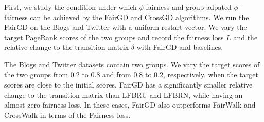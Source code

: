 
\subsubsection{\pagerank}


First, we study the condition under which $\phi$-fairness and group-adpated $\phi$-fairness can be achieved by the FairGD and CrossGD algorithms. We run the FairGD on the Blogs and Twitter with a uniform restart vector. We vary the target PageRank scores of the two groups and record the fairness loss $L$ and the relative change to the transition matrix $\delta$ with FairGD and baselines. 






The Blogs and Twitter datasets contain two groups.
We vary the target \pagerank scores of the two groups
from 0.2 to 0.8 and from 0.8 to 0.2, respectively.
when the target \pagerank scores are close to the initial \pagerank scores,
FairGD has a significantly smaller relative change to the transition matrix
than LFBRU and LFBRN, while having an almost zero fairness loss.
In these cases, FairGD also outperforms FairWalk and CrossWalk in terms of the Fairness loss.

